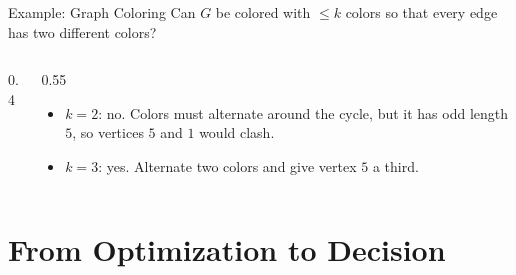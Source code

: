\documentclass[10pt,aspectratio=169]{beamer}
\begin{document}
\begin{frame}{Example: Graph Coloring}
  Can $G$ be colored with $\le k$ colors so that every edge has two different
  colors?

  \begin{columns}[c]
    \begin{column}{0.4\textwidth}
      \begin{center}
      \end{center}
    \end{column}
    \begin{column}{0.55\textwidth}
      \begin{itemize}
        \item<2-> $k = 2$: \alert{no}. Colors must alternate around the
              cycle, but it has odd length $5$, so vertices $5$ and $1$ would
              clash.
        \item<3-> $k = 3$: \alert{yes}. Alternate two colors and give
              vertex $5$ a third.
      \end{itemize}
    \end{column}
  \end{columns}
\end{frame}

\section{From Optimization to Decision}
\end{document}
